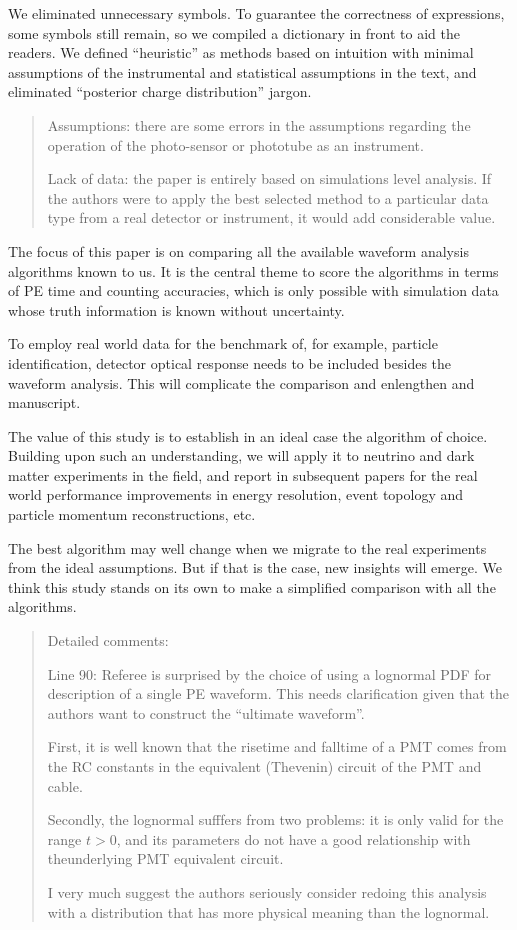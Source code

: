 \documentclass[12pt]{article}
\begin{document}
We eliminated unnecessary symbols. To guarantee the correctness of expressions, some symbols still remain, so we compiled a dictionary in front to aid the readers.  We defined ``heuristic'' as methods based on intuition with minimal assumptions of the instrumental and statistical assumptions in the text, and eliminated ``posterior charge distribution'' jargon.

\begin{quote}
Assumptions: there are some errors in the assumptions regarding the operation of the photo-sensor or phototube as an instrument.

Lack of data: the paper is entirely based on simulations level analysis. If the authors were to apply the best selected method to a particular data type from a real detector or instrument, it would add considerable value.
\end{quote}

The focus of this paper is on comparing all the available waveform analysis algorithms known to us.  It is the central theme to score the algorithms in terms of PE time and counting accuracies, which is only possible with simulation data whose truth information is known without uncertainty.

To employ real world data for the benchmark of, for example, particle identification, detector optical response needs to be included besides the waveform analysis.  This will complicate the comparison and enlengthen and manuscript.

The value of this study is to establish in an ideal case the algorithm of choice.  Building upon such an understanding, we will apply it to neutrino and dark matter experiments in the field, and report in subsequent papers for the real world performance improvements in energy resolution, event topology and particle momentum reconstructions, etc.

The best algorithm may well change when we migrate to the real experiments from the ideal assumptions.  But if that is the case, new insights will emerge.  We think this study stands on its own to make a simplified comparison with all the algorithms.

\begin{quote}

Detailed comments:

Line 90: Referee is surprised by the choice of using a lognormal PDF for description of a single PE waveform. This needs clarification given that the authors want to construct the ``ultimate waveform''.

First, it is well known that the risetime and falltime of a PMT comes from the RC constants in the equivalent (Thevenin) circuit of the PMT and cable. 

Secondly, the lognormal sufffers from two problems: it is only valid for the range $t>0$, and its parameters do not have a good relationship with theunderlying PMT equivalent circuit.

I very much suggest the authors seriously consider redoing this analysis with a distribution that has more physical meaning than the lognormal. 
\end{quote}
\end{document}
